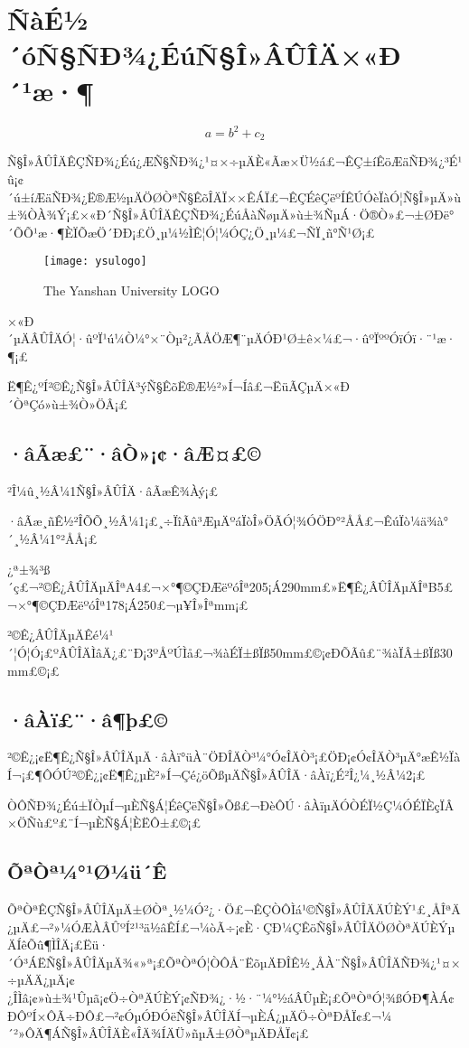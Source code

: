 
\chapter{ÑàÉ½´óÑ§ÑÐ¾¿ÉúÑ§Î»ÂÛÎÄ×«Ð´¹æ·¶}
\label{chap:requires}

\begin{equation}
a=b^2+c_2
\end{equation}

Ñ§Î»ÂÛÎÄÊÇÑÐ¾¿Éú¿ÆÑ§ÑÐ¾¿¹¤×÷µÄÈ«Ãæ×Ü½á£¬ÊÇ±íÊöÆäÑÐ¾¿³É¹û¡¢´ú±íÆäÑÐ¾¿Ë®Æ½µÄÖØÒªÑ§ÊõÎÄÏ××ÊÁÏ£¬ÊÇÉêÇëºÍÊÚÓèÏàÓ¦Ñ§Î»µÄ»ù±¾ÒÀ¾Ý¡£×«Ð´Ñ§Î»ÂÛÎÄÊÇÑÐ¾¿ÉúÅàÑøµÄ»ù±¾ÑµÁ·Ö®Ò»£¬±ØÐë°´ÕÕ¹æ·¶ÈÏÕæÖ´ÐÐ¡£Ö¸µ¼½ÌÊ¦Ó¦¼ÓÇ¿Ö¸µ¼£¬ÑÏ¸ñ°Ñ¹Ø¡£
\begin{figure}[htbp]
\centering
\texttt{[image: ysulogo]}
\caption{The Yanshan University LOGO}
\end{figure}
×«Ð´µÄÂÛÎÄÓ¦·ûºÏ¹ú¼Ò¼°×¨Òµ²¿ÃÅÖÆ¶¨µÄÓÐ¹Ø±ê×¼£¬·ûºÏººÓïÓï·¨¹æ·¶¡£

Ë¶Ê¿ºÍ²©Ê¿Ñ§Î»ÂÛÎÄ³ýÑ§ÊõË®Æ½²»Í¬Íâ£¬ËüÃÇµÄ×«Ð´ÒªÇó»ù±¾Ò»ÖÂ¡£

\section{·âÃæ£¨·âÒ»¡¢·âÆ¤£©}

²Î¼û¸½Â¼1Ñ§Î»ÂÛÎÄ·âÃæÊ¾Àý¡£

·âÃæ¸ñÊ½²ÎÕÕ¸½Â¼1¡£¸÷ÏîÃû³ÆµÄºáÏòÎ»ÖÃÓ¦¾ÓÖÐ°²ÅÅ£¬ÊúÏò¼ä¾à°´¸½Â¼1°²ÅÅ¡£

¿ª±¾³ß´ç£¬²©Ê¿ÂÛÎÄµÄÎªA4£¬×°¶©ÇÐÆëºóÎª205¡Á290mm£»Ë¶Ê¿ÂÛÎÄµÄÎªB5£¬×°¶©ÇÐÆëºóÎª178¡Á250£¬µ¥Î»Îªmm¡£

²©Ê¿ÂÛÎÄµÄÊé¼¹´¦Ó¦Ó¡£ºÂÛÎÄÌâÄ¿£¨Ð¡3ºÅºÚÌå£¬¾àÉÏ±ßÏß50mm£©¡¢ÐÕÃû£¨¾àÏÂ±ßÏß30 mm£©¡£

\section{·âÀï£¨·â¶þ£©}

²©Ê¿¡¢Ë¶Ê¿Ñ§Î»ÂÛÎÄµÄ·âÀï°üÀ¨ÖÐÎÄÒ³¼°Ó¢ÎÄÒ³¡£ÖÐ¡¢Ó¢ÎÄÒ³µÄ°æÊ½ÏàÍ¬¡£¶ÔÓÚ²©Ê¿¡¢Ë¶Ê¿µÈ²»Í¬Çé¿öÕßµÄÑ§Î»ÂÛÎÄ·âÀï¿É²Î¿¼¸½Â¼2¡£

ÒÔÑÐ¾¿Éú±ÏÒµÍ¬µÈÑ§Á¦ÉêÇëÑ§Î»Õß£¬ÐèÔÚ·âÀïµÄÓÒÉÏ½Ç¼ÓÉÏÈçÏÂ×ÖÑù£º£¨Í¬µÈÑ§Á¦ÈËÔ±£©¡£

\section{ÕªÒª¼°¹Ø¼ü´Ê}

ÕªÒªÊÇÑ§Î»ÂÛÎÄµÄ±ØÒª¸½¼Ó²¿·Ö£¬ÊÇÒÔÌá¹©Ñ§Î»ÂÛÎÄÄÚÈÝ¹£¸ÅÎªÄ¿µÄ£¬²»¼ÓÆÀÂÛºÍ²¹³ä½âÊÍ£¬¼òÃ÷¡¢È·ÇÐ¼ÇÊöÑ§Î»ÂÛÎÄÖØÒªÄÚÈÝµÄÍêÕû¶ÌÎÄ¡£Ëü·´Ó³ÁËÑ§Î»ÂÛÎÄµÄ¾«»ª¡£ÕªÒªÓ¦ÒÔÅ¨ËõµÄÐÎÊ½¸ÅÀ¨Ñ§Î»ÂÛÎÄÑÐ¾¿¹¤×÷µÄÄ¿µÄ¡¢¿ÎÌâ¡¢»ù±¾¹Ûµã¡¢Ö÷ÒªÄÚÈÝ¡¢ÑÐ¾¿·½·¨¼°½áÂÛµÈ¡£ÕªÒªÓ¦¾ßÓÐ¶ÀÁ¢ÐÔºÍ×ÔÃ÷ÐÔ£¬²¢ÓµÓÐÓëÑ§Î»ÂÛÎÄÍ¬µÈÁ¿µÄÖ÷ÒªÐÅÏ¢£¬¼´²»ÔÄ¶ÁÑ§Î»ÂÛÎÄÈ«ÎÄ¾ÍÄÜ»ñµÃ±ØÒªµÄÐÅÏ¢¡£

